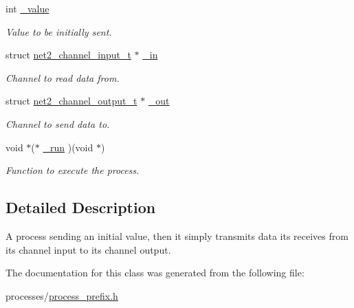 \begin{DoxyCompactItemize}
\item 
\hypertarget{structprocess__prefix__int__t_a3eb6bb5119e08bf5a9696eec979125f9}{int \hyperlink{structprocess__prefix__int__t_a3eb6bb5119e08bf5a9696eec979125f9}{\-\_\-value}}\label{structprocess__prefix__int__t_a3eb6bb5119e08bf5a9696eec979125f9}

\begin{DoxyCompactList}\small\item\em Value to be initially sent. \end{DoxyCompactList}\item 
\hypertarget{structprocess__prefix__int__t_ad19e6225649b296a9e7b4b3b369c6ebb}{struct \hyperlink{structnet2__channel__input__t}{net2\-\_\-channel\-\_\-input\-\_\-t} $\ast$ \hyperlink{structprocess__prefix__int__t_ad19e6225649b296a9e7b4b3b369c6ebb}{\-\_\-in}}\label{structprocess__prefix__int__t_ad19e6225649b296a9e7b4b3b369c6ebb}

\begin{DoxyCompactList}\small\item\em Channel to read data from. \end{DoxyCompactList}\item 
\hypertarget{structprocess__prefix__int__t_a96137e412c64efd095310606260dddb4}{struct \hyperlink{structnet2__channel__output__t}{net2\-\_\-channel\-\_\-output\-\_\-t} $\ast$ \hyperlink{structprocess__prefix__int__t_a96137e412c64efd095310606260dddb4}{\-\_\-out}}\label{structprocess__prefix__int__t_a96137e412c64efd095310606260dddb4}

\begin{DoxyCompactList}\small\item\em Channel to send data to. \end{DoxyCompactList}\item 
\hypertarget{structprocess__prefix__int__t_a572f7b83420cd0eff38ad63f4de53bb5}{void $\ast$($\ast$ \hyperlink{structprocess__prefix__int__t_a572f7b83420cd0eff38ad63f4de53bb5}{\-\_\-run} )(void $\ast$)}\label{structprocess__prefix__int__t_a572f7b83420cd0eff38ad63f4de53bb5}

\begin{DoxyCompactList}\small\item\em Function to execute the process. \end{DoxyCompactList}\end{DoxyCompactItemize}


\subsection{Detailed Description}
A process sending an initial value, then it simply transmits data its receives from its channel input to its channel output. 

The documentation for this class was generated from the following file\-:\begin{DoxyCompactItemize}
\item 
processes/\hyperlink{process__prefix_8h}{process\-\_\-prefix.\-h}\end{DoxyCompactItemize}
